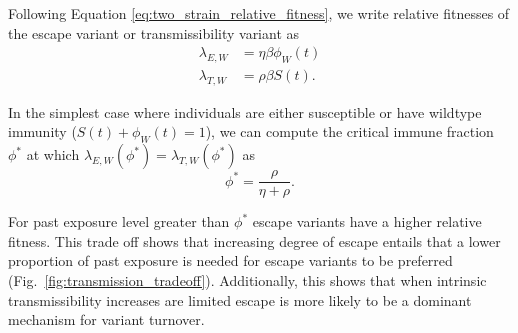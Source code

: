 \documentclass[11pt,oneside,letterpaper]{article}
\newcommand{\wt}{W}
\newcommand{\varE}{E}
\newcommand{\varT}{T}
\newcommand{\varEscape}{\eta}
\newcommand{\varTransmission}{\rho}
\begin{document}
Following Equation \ref{eq:two_strain_relative_fitness}, we write relative fitnesses of the escape variant or transmissibility variant as
\begin{align*}
    \lambda_{\varE, \wt} &= \varEscape \beta \phi_{\wt}(t)\\
    \lambda_{\varT, \wt} &= \varTransmission \beta S(t).
\end{align*}

In the simplest case where individuals are either susceptible or have wildtype immunity ($S(t) + \phi_{\wt}(t) = 1$), we can compute the critical immune fraction $\phi^{*}$ at which $\lambda_{\varE, \wt}(\phi^{*}) = \lambda_{\varT, \wt}(\phi^{*})$ as
\begin{equation} \label{eq:critical_immunity}
    \phi^{*} = \frac{\varTransmission}{\varEscape + \varTransmission}.
\end{equation}

For past exposure level greater than $\phi^{*}$ escape variants have a higher relative fitness.
This trade off shows that increasing degree of escape entails that a lower proportion of past exposure is needed for escape variants to be preferred (Fig.~\ref{fig:transmission_tradeoff}).
Additionally, this shows that when intrinsic transmissibility increases are limited escape is more likely to be a dominant mechanism for variant turnover.
\end{document}
